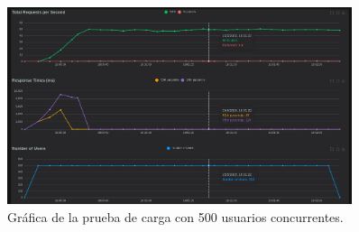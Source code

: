 \begin{table}[H]
\centering
{}
\caption{Resultados de la prueba de carga con 500 usuarios concurrentes.}
\label{tab:locust500}
\end{table}

\begin{figure}[H]
\centering
\includegraphics[width=0.9\textwidth]{figures/08_500_1.png}
\caption{Gráfica de la prueba de carga con 500 usuarios concurrentes.}
\label{fig:locust500}
\end{figure}

